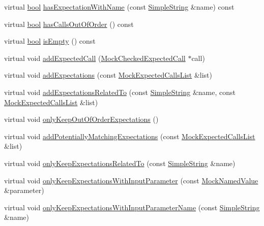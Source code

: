\begin{DoxyCompactItemize}
\item 
virtual \hyperlink{avb__gptp_8h_af6a258d8f3ee5206d682d799316314b1}{bool} \hyperlink{class_mock_expected_calls_list_abc07f8d24b76a0d76aba12c8307bf90f}{has\+Expectation\+With\+Name} (const \hyperlink{class_simple_string}{Simple\+String} \&name) const 
\item 
virtual \hyperlink{avb__gptp_8h_af6a258d8f3ee5206d682d799316314b1}{bool} \hyperlink{class_mock_expected_calls_list_a5fe56334ba5e10a4677844b62e7e69c4}{has\+Calls\+Out\+Of\+Order} () const 
\item 
virtual \hyperlink{avb__gptp_8h_af6a258d8f3ee5206d682d799316314b1}{bool} \hyperlink{class_mock_expected_calls_list_a479432127ee77145cc19d6a2d1590821}{is\+Empty} () const 
\item 
virtual void \hyperlink{class_mock_expected_calls_list_a93aa2234c01260b1e76ceef59f8cfaee}{add\+Expected\+Call} (\hyperlink{class_mock_checked_expected_call}{Mock\+Checked\+Expected\+Call} $\ast$call)
\item 
virtual void \hyperlink{class_mock_expected_calls_list_a391840ec7f7c5cef242747f126ce4484}{add\+Expectations} (const \hyperlink{class_mock_expected_calls_list}{Mock\+Expected\+Calls\+List} \&list)
\item 
virtual void \hyperlink{class_mock_expected_calls_list_a462f63288f7f9ae4b33d0b5d0eca265e}{add\+Expectations\+Related\+To} (const \hyperlink{class_simple_string}{Simple\+String} \&name, const \hyperlink{class_mock_expected_calls_list}{Mock\+Expected\+Calls\+List} \&list)
\item 
virtual void \hyperlink{class_mock_expected_calls_list_af78904a7f66b28b2c3d88ddfd5f0479a}{only\+Keep\+Out\+Of\+Order\+Expectations} ()
\item 
virtual void \hyperlink{class_mock_expected_calls_list_acc0ff899b5ca2a40e906b2966e9e340f}{add\+Potentially\+Matching\+Expectations} (const \hyperlink{class_mock_expected_calls_list}{Mock\+Expected\+Calls\+List} \&list)
\item 
virtual void \hyperlink{class_mock_expected_calls_list_a108af446766baeaec398000b6a4fd418}{only\+Keep\+Expectations\+Related\+To} (const \hyperlink{class_simple_string}{Simple\+String} \&name)
\item 
virtual void \hyperlink{class_mock_expected_calls_list_a22b3e41fc543763ee323cf2fb84f7820}{only\+Keep\+Expectations\+With\+Input\+Parameter} (const \hyperlink{class_mock_named_value}{Mock\+Named\+Value} \&parameter)
\item 
virtual void \hyperlink{class_mock_expected_calls_list_a1f78cc6c0afaaab2bc11c4de935d73b5}{only\+Keep\+Expectations\+With\+Input\+Parameter\+Name} (const \hyperlink{class_simple_string}{Simple\+String} \&name)

\end{DoxyCompactItemize}
